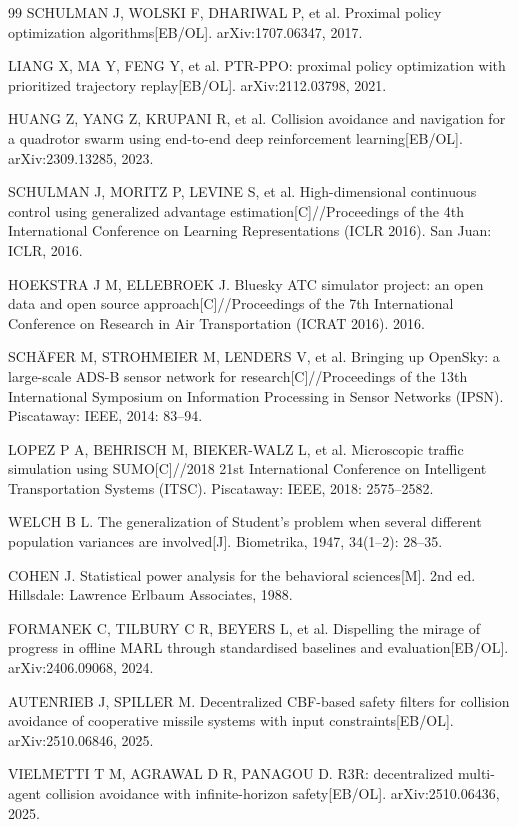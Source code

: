 \documentclass[12pt,a4paper,UTF8]{ctexart}
\begin{document}
\begin{thebibliography}{99}
 SCHULMAN J, WOLSKI F, DHARIWAL P, et al. Proximal policy optimization algorithms[EB/OL]. arXiv:1707.06347, 2017.

 LIANG X, MA Y, FENG Y, et al. PTR-PPO: proximal policy optimization with prioritized trajectory replay[EB/OL]. arXiv:2112.03798, 2021.

 HUANG Z, YANG Z, KRUPANI R, et al. Collision avoidance and navigation for a quadrotor swarm using end-to-end deep reinforcement learning[EB/OL]. arXiv:2309.13285, 2023.

 SCHULMAN J, MORITZ P, LEVINE S, et al. High-dimensional continuous control using generalized advantage estimation[C]//Proceedings of the 4th International Conference on Learning Representations (ICLR 2016). San Juan: ICLR, 2016.

 HOEKSTRA J M, ELLEBROEK J. Bluesky ATC simulator project: an open data and open source approach[C]//Proceedings of the 7th International Conference on Research in Air Transportation (ICRAT 2016). 2016.

 SCH\"{A}FER M, STROHMEIER M, LENDERS V, et al. Bringing up OpenSky: a large-scale ADS-B sensor network for research[C]//Proceedings of the 13th International Symposium on Information Processing in Sensor Networks (IPSN). Piscataway: IEEE, 2014: 83--94.

 LOPEZ P A, BEHRISCH M, BIEKER-WALZ L, et al. Microscopic traffic simulation using SUMO[C]//2018 21st International Conference on Intelligent Transportation Systems (ITSC). Piscataway: IEEE, 2018: 2575--2582.

 WELCH B L. The generalization of Student's problem when several different population variances are involved[J]. Biometrika, 1947, 34(1--2): 28--35.

 COHEN J. Statistical power analysis for the behavioral sciences[M]. 2nd ed. Hillsdale: Lawrence Erlbaum Associates, 1988.

 FORMANEK C, TILBURY C R, BEYERS L, et al. Dispelling the mirage of progress in offline MARL through standardised baselines and evaluation[EB/OL]. arXiv:2406.09068, 2024.

 AUTENRIEB J, SPILLER M. Decentralized CBF-based safety filters for collision avoidance of cooperative missile systems with input constraints[EB/OL]. arXiv:2510.06846, 2025.

 VIELMETTI T M, AGRAWAL D R, PANAGOU D. R3R: decentralized multi-agent collision avoidance with infinite-horizon safety[EB/OL]. arXiv:2510.06436, 2025.
\end{thebibliography}
\end{document}
